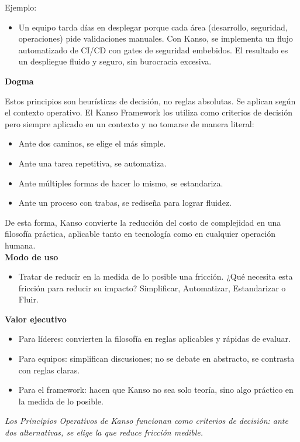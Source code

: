 Ejemplo:
\begin{itemize}
    \item Un equipo tarda días en desplegar porque cada área (desarrollo, seguridad, operaciones) pide validaciones manuales. Con Kanso, se implementa un flujo automatizado de CI/CD con gates de seguridad embebidos. El resultado es un despliegue fluido y seguro, sin burocracia excesiva.
\end{itemize}

\textbf{Dogma}

Estos principios son heurísticas de decisión, no reglas absolutas. Se aplican según el contexto operativo. El Kanso Framework los utiliza como criterios de decisión pero siempre aplicado en un contexto y no tomarse de manera literal:
\begin{itemize}
    \item Ante dos caminos, se elige el más simple.
    \item Ante una tarea repetitiva, se automatiza.
    \item Ante múltiples formas de hacer lo mismo, se estandariza.
    \item Ante un proceso con trabas, se rediseña para lograr fluidez.
\end{itemize}

De esta forma, Kanso convierte la reducción del costo de complejidad en una filosofía práctica, aplicable tanto en tecnología como en cualquier operación humana.\\

\textbf{Modo de uso}
\begin{itemize}
    \item Tratar de reducir en la medida de lo posible una fricción. ¿Qué necesita esta fricción para reducir su impacto? Simplificar, Automatizar, Estandarizar o Fluir.
\end{itemize}


\textbf{Valor ejecutivo}
\begin{itemize}
    \item Para líderes: convierten la filosofía en reglas aplicables y rápidas de evaluar.
    \item Para equipos: simplifican discusiones; no se debate en abstracto, se contrasta con reglas claras.
    \item Para el framework: hacen que Kanso no sea solo teoría, sino algo práctico en la medida de lo posible.
\end{itemize}

{\epigraph{\textit{Los Principios Operativos de Kanso funcionan como criterios de decisión: ante dos alternativas, se elige la que reduce fricción medible.}}{}}


